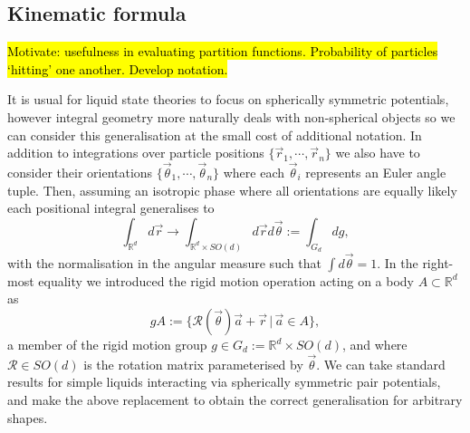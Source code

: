 \subsection{Kinematic formula}
\label{sec:kinematic-formula}

\hl{Motivate: usefulness in evaluating partition functions.
Probability of particles `hitting' one another.
Develop notation.}

It is usual for liquid state theories to focus on spherically symmetric potentials, however integral geometry more naturally deals with non-spherical objects so we can consider this generalisation at the small cost of additional notation.
In addition to integrations over particle positions $\{\vec{r}_1, \cdots, \vec{r}_n\}$ we also have to consider their orientations $\{\vec{\theta}_1, \cdots, \vec{\theta}_n\}$ where each $\vec{\theta}_i$ represents an Euler angle tuple.
Then, assuming an isotropic phase where all orientations are equally likely each positional integral generalises to
\begin{equation*}
  \int_{\mathbb{R}^d} d\vec{r}
  \to
  \int_{\mathbb{R}^d \times SO(d)} d\vec{r} d\vec{\theta}
  :=
  \int_{G_d} dg,
\end{equation*}
with the normalisation in the angular measure such that $\int d\vec{\theta} = 1$. In the right-most equality we introduced the rigid motion operation acting on a body $A \subset \mathbb{R}^d$ as
\begin{equation*}
  g A := \{\mathcal{R}(\vec{\theta}) \vec{a} + \vec{r} \, | \, \vec{a} \in A\},
\end{equation*}
a member of the rigid motion group $g \in G_d := \mathbb{R}^d \times SO(d)$, and where $\mathcal{R} \in SO(d)$ is the rotation matrix parameterised by $\vec{\theta}$.
We can take standard results for simple liquids interacting via spherically symmetric pair potentials, and make the above replacement to obtain the correct generalisation for arbitrary shapes.

